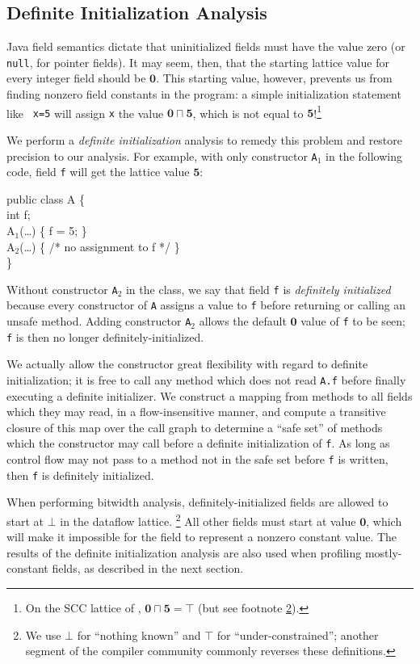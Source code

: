\documentclass{sig-alt-full}
\newcommand{\meet}{\ensuremath{\sqcap}}
\begin{document}
\subsection{Definite Initialization Analysis}
Java field semantics dictate that uninitialized fields must have
the value zero (or {\tt null}, for pointer fields).  It may seem,
then, that the starting lattice value for every integer field should
be $\mathbf{0}$.  This starting value, however, prevents us from
finding nonzero field
constants in the program: a simple initialization statement like {\tt
  x=5} will assign {\tt x} the value $\mathbf{0}\meet\mathbf{5}$,
which is not equal to $\mathbf{5}$!\footnote{On the SCC lattice of
\cite{wegman91:scc}, $\mathbf{0}\meet\mathbf{5}=\top$ (but see
footnote \ref{ft:topbot}).}

We perform a {\it definite initialization} analysis to remedy this
problem and restore precision to our analysis.
For example, with only constructor {\tt A$_1$} in the following code,
field {\tt f} will get the lattice value $\mathbf{5}$:
{\small\renewcommand{\baselinestretch}{0.5}\begin{samplecode}
public class A \{\\
\>int f;\\
\>A$_1$(\ldots) \{ f = 5; \}\\
\>A$_2$(\ldots) \{ /* no assignment to f */ \}\\
\}
\end{samplecode}%
}
Without constructor {\tt A$_2$} in the class,
we say that field {\tt f} is {\it definitely initialized} because
every constructor of {\tt A} assigns a value to {\tt f} before
returning or calling an unsafe method.
Adding constructor {\tt A$_2$} allows the
default $\mathbf{0}$ value of {\tt f} to be seen; {\tt f} is then no longer
definitely-initialized.

We actually allow the constructor great flexibility with regard to
definite initialization; it is free to call any method which does not
read {\tt A.f} before finally executing a definite initializer.
We construct a mapping from methods to all
fields which they may read, in a flow-insensitive manner, and compute
a transitive closure of this map over the call graph to determine 
a ``safe set'' of
methods which the constructor may call before a definite
initialization of {\tt f}.  As long as control flow may not pass to a
method not in the safe set before {\tt f} is written, then {\tt f} is
definitely initialized.

When performing bitwidth analysis,
definitely-initialized fields are allowed to start at $\bot$ in the
dataflow lattice.%
\footnote{We use $\bot$ for ``nothing known'' and $\top$ for
  ``under-constrained''; another segment of the compiler community
  commonly reverses these definitions.\label{ft:topbot}}
  All other fields must start at value
$\mathbf{0}$, which will make it impossible for the field to represent a
nonzero constant value.  The results of the definite initialization
analysis are also used when profiling mostly-constant fields, as described
in the next section.
%
\end{document}
